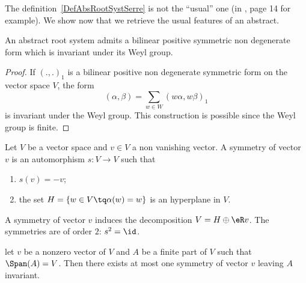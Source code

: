 The definition~\ref{DefAbsRootSystSerre} is not the ``usual'' one (in \cite{Wisser}, page 14 for example). We show now that we retrieve the usual features of an abstract.

\begin{lemma}
    An abstract root system admits a bilinear positive symmetric non degenerate form which is invariant under its Weyl group.
\end{lemma}

\begin{proof}
    If \( (.,.)_1\) is a bilinear positive non degenerate symmetric form on the vector space \( V\), the form
    \begin{equation}
        (\alpha,\beta)=\sum_{w\in W}(w\alpha,w\beta)_1
    \end{equation}
    is invariant under the Weyl group. This construction is possible since the Weyl group is finite.
\end{proof}

\begin{definition}
    Let \( V\) be a vector space and \( v\in V\) a non vanishing vector. A symmetry of vector \( v\) is an automorphism \( s\colon V\to V\) such that
    \begin{enumerate}
        \item
            \( s(v)=-v\);
        \item
            the set \( H=\{ w\in V\tq \alpha(w)=w \}\) is an hyperplane in \( V\).
    \end{enumerate}
\end{definition}
A symmetry of vector \( v\) induces the decomposition \( V=H\oplus\eR v\). The symmetries are of order \( 2\): \( s^2=\id\).

\begin{lemma}
    let \( v\) be a nonzero vector of \( V\) and \( A\) be a finite part of \( V\) such that \( \Span(A)=V\). Then there exists at most one symmetry of vector \( v\) leaving \( A\) invariant.
\end{lemma}

